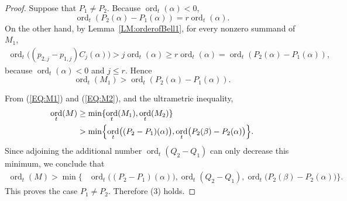 \documentclass{article}
\DeclareMathOperator{\ord}{ord}
\begin{document}
\begin{proof}
Suppose that $P_1\neq P_2$. Because
$\ord_t(\alpha)<0$,
$$
  \ord_t(P_2(\alpha)-P_1(\alpha))=r\ord_t(\alpha).
$$
On the other hand, by Lemma~\ref{LM:orderofBell1}, for every nonzero summand of $M_1$, 
\[
\begin{aligned}
  \ord_t\bigl((p_{2,j}-p_{1,j})C_j(\alpha)\bigr)
  >j\ord_t(\alpha)
  \geq r\ord_t(\alpha)
   =\ord_t(P_2(\alpha)-P_1(\alpha)),
\end{aligned}
\]
because
$\ord_t(\alpha)<0$ and $j\leq r$. Hence
\begin{equation}
  \label{EQ:M1}
  \ord_t(M_1)> \ord_t(P_2(\alpha)-P_1(\alpha)).
\end{equation}

From (\ref{EQ:M1}) and (\ref{EQ:M2}), and the ultrametric inequality,
\[
\begin{aligned}
  \ord_t(M)
  &\geq \min\{\ord_t(M_1),\ord_t(M_2)\}\\
  &>\min\Bigl\{
      \ord_t\bigl((P_2-P_1)(\alpha)\bigr),
      \ord_t\bigl(P_2(\beta)-P_2(\alpha)\bigr)
     \Bigr\}.
\end{aligned}
\]
Since adjoining the additional number $\ord_t(Q_2-Q_1)$ can only decrease
this minimum, we conclude that
\[
\begin{aligned}
  \ord_t(M)>
  \min\bigl\{&\ord_t\bigl((P_2-P_1)(\alpha)\bigr),
  \ord_t(Q_2-Q_1),
  \ord_t\bigl(P_2(\beta)-P_2(\alpha)\bigr)\bigr\}.
\end{aligned}
\]
This proves the case $P_1\neq P_2$. Therefore (3) holds. 
\end{proof}
\end{document}

